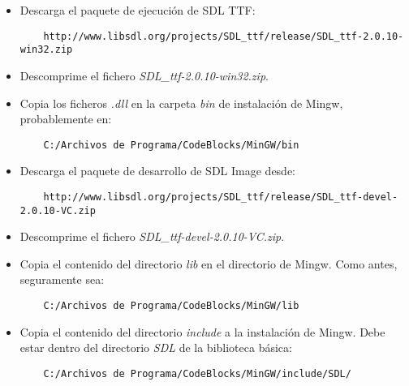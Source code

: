 \documentclass[16pt,spanish]{article}
\begin{document}
\begin{itemize}
	\item Descarga el paquete de ejecución de SDL TTF:
	\begin{verbatim}
	http://www.libsdl.org/projects/SDL_ttf/release/SDL_ttf-2.0.10-win32.zip
	\end{verbatim}
	\item Descomprime el fichero \emph{SDL\_ttf-2.0.10-win32.zip}.
	\item Copia los ficheros \emph{.dll} en la carpeta \emph{bin} de instalación
	de Mingw, probablemente en:
	\begin{verbatim}
	C:/Archivos de Programa/CodeBlocks/MinGW/bin
	\end{verbatim}
	\item Descarga el paquete de desarrollo de SDL Image desde:
	\begin{verbatim}
	http://www.libsdl.org/projects/SDL_ttf/release/SDL_ttf-devel-2.0.10-VC.zip
	\end{verbatim}
	\item Descomprime el fichero \emph{SDL\_ttf-devel-2.0.10-VC.zip}.
	\item Copia el contenido del directorio \emph{lib} en el directorio
	de Mingw. Como antes, seguramente sea:
	\begin{verbatim}
	C:/Archivos de Programa/CodeBlocks/MinGW/lib
	\end{verbatim}
	\item Copia el contenido del directorio \emph{include} a la instalación de Mingw.
	Debe estar dentro del directorio \emph{SDL} de la biblioteca básica:
	\begin{verbatim}
	C:/Archivos de Programa/CodeBlocks/MinGW/include/SDL/
	\end{verbatim}
\end{itemize}
\end{document}
